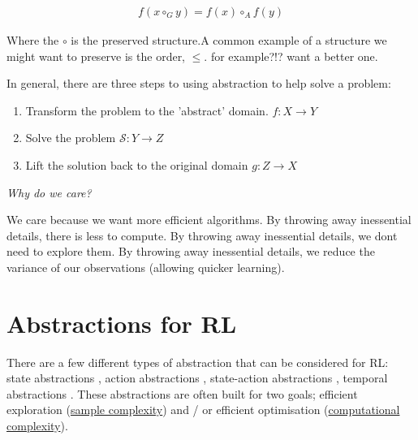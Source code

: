 \begin{align*}
f(x \circ_G y) = f(x) \circ_A f(y)
\end{align*}

Where the $\circ$ is the preserved structure.\footnotemark[19]
A common example of a structure we might want to preserve is the order, $\le$.
{\color{red}for example?!? want a better one.}


In general, there are three steps to using abstraction to help solve a problem:

\begin{enumerate}
\tightlist
  \item Transform the problem to the 'abstract' domain. $f: X\to Y$
  \item Solve the problem $\mathcal S: Y \to Z$
  \item Lift the solution back to the original domain  $g:Z \to X$
\end{enumerate}


\begin{displayquote}
 \textit{Why do we care?}
\end{displayquote}

We care because we want more efficient algorithms.
By throwing away inessential details, there is less to compute.
By throwing away inessential details, we dont need to explore them.
By throwing away inessential details, we reduce the variance of our
observations (allowing quicker learning).

%

\section{Abstractions for RL}


There are a few different types of abstraction that can be considered for RL:
state abstractions \cite{Anand2019, Littman2006,Haarnoja,Cuccu2018,Zhonga,Vezzani2019,Abel2018,Duan2018,Abel2017,Silver2016a},
action abstractions \cite{Chandak2019,Bester2019,Tennenholtz2019,Nagabandi2019}, state-action abstractions \cite{Dayan1993,Barreto2017}, temporal abstractions \cite{Christodoulou2019, Rafati,Mankowitz2018,Harutyunyan2017,Fruit2017,Riemer2018,Bacon2018,Achiam2018,Pham2019,Konidaris2018,Haarnoja,Sutton1999,Fruit2017a,Bacon2016a,Jinnai2018,Nachum2018}.
These abstractions are often built for two goals; efficient exploration
(\href{https://en.wikipedia.org/wiki/Sample_complexity}{sample complexity})
and / or efficient optimisation (\href{https://en.wikipedia.org/wiki/Computational_complexity_theory}{computational complexity}).

